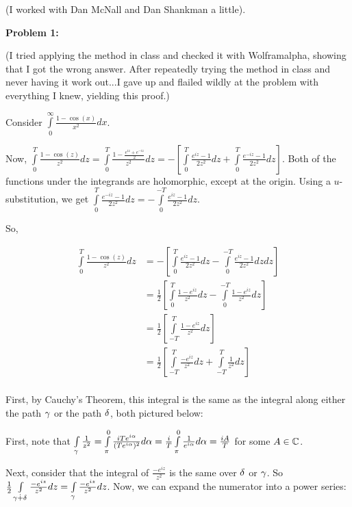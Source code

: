 \documentclass[a4paper,12pt]{article}
\begin{document}
(I worked with Dan McNall and Dan Shankman a little).

{\bf Problem 1:} %

(I tried applying the method in class and checked it with Wolframalpha, showing that I got the wrong answer. After repeatedly trying the method in class and never having it work out...I gave up and flailed wildly at the problem with everything I knew, yielding this proof.)

Consider $\int\limits_0^\infty \frac{1-\cos(x)}{x^2} dx$.

Now, $\int\limits_0^T\frac{1-\cos(z)}{z^2} dz = \int\limits_0^T\frac{1-\frac{e^{iz}+e^{-iz}}{2}}{z^2} dz = -\left[\int\limits_0^T \frac{e^{iz}-1}{2z^2} dz+ \int\limits_0^T \frac{e^{-iz}-1}{2z^2} dz\right]$. Both of the functions under the integrands are holomorphic, except at the origin. Using a $u$-substitution, we get $\int\limits_0^T \frac{e^{-iz}-1}{2z^2} dz = -\int\limits_0^{-T} \frac{e^{iz}-1}{2z^2} dz$.

So, 

\begin{align*}
\int\limits_0^T\frac{1-\cos(z)}{z^2} dz &= -\left[\int\limits_0^T \frac{e^{iz}-1}{2z^2} dz- \int\limits_0^{-T} \frac{e^{iz}-1}{2z^2} dz dz\right]\\
&= \frac{1}{2}\left[\int\limits_0^T \frac{1-e^{iz}}{z^2} dz-\int\limits_0^{-T} \frac{1-e^{iz}}{z^2} dz \right]\\
&= \frac{1}{2}\left[\int\limits_{-T}^T \frac{1-e^{iz}}{z^2} dz \right]\\
&= \frac{1}{2}\left[\int\limits_{-T}^T \frac{-e^{iz}}{z^2} dz + \int\limits_{-T}^T \frac{1}{z^2} dz \right]\\
\end{align*}

First, by Cauchy's Theorem, this integral is the same as the integral along either the path $\gamma$ or the path $\delta$, both pictured below:

\shunt %

First, note that $\int\limits_\gamma \frac{1}{z^2} = \int\limits_\pi^0 \frac{iTe^{i\alpha}}{(Te^{i\alpha})^2} d\alpha = \frac{i}{T}\int\limits_\pi^0 \frac{1}{e^{i\alpha}} d\alpha = \frac{iA}{T}$ for some $A \in \mathbb{C}$.

Next, consider that the integral of $\frac{-e^{iz}}{z^2}$ is the same over $\delta$ or $\gamma$. So $\frac{1}{2}\int\limits_{\gamma \dot{+} \delta} \frac{-e^{iz}}{z^2} dz = \int\limits_{\gamma} \frac{-e^{iz}}{z^2} dz $. Now, we can expand the numerator into a power series:
\end{document}
